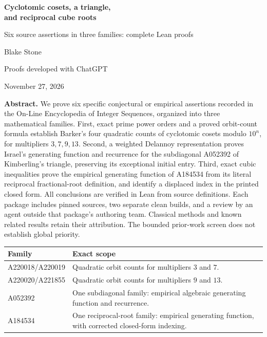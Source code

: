 \documentclass[11pt]{article}
\begin{document}
\begin{center}
{\LARGE\bfseries Cyclotomic cosets, a triangle,\\[3pt]
and reciprocal cube roots}\par
\vspace{0.5em}
{\large Six source assertions in three families: complete Lean proofs}\par
\vspace{0.5em}
{\large Blake Stone}\par
Proofs developed with ChatGPT\par
November 27, 2026
\end{center}

\textbf{Abstract.}
We prove six specific conjectural or empirical assertions recorded in the
On-Line Encyclopedia of Integer Sequences, organized into three mathematical
families. First, exact prime power orders and a proved orbit-count formula
establish Barker's four quadratic counts of cyclotomic cosets modulo $10^n$,
for multipliers $3,7,9,13$. Second, a weighted Delannoy representation proves
Israel's generating function and recurrence for the subdiagonal A052392 of
Kimberling's triangle, preserving its exceptional initial entry. Third, exact
cubic inequalities prove the empirical generating function of A184534 from
its literal reciprocal fractional-root definition, and identify a displaced
index in the printed closed form. All conclusions are verified in Lean from
source definitions. Each package includes pinned sources, two separate clean
builds, and a review by an agent outside that package's authoring team.
Classical methods and known related results retain their attribution.
The bounded prior-work screen does not establish global priority.

\begin{center}
\begin{tabular}{@{}l>{\raggedright\arraybackslash}p{4.2in}@{}}
\toprule
Family & Exact scope\\
\midrule
A220018/A220019 & Quadratic orbit counts for multipliers $3$ and $7$.\\
A220020/A221855 & Quadratic orbit counts for multipliers $9$ and $13$.\\
A052392 & One subdiagonal family: empirical algebraic generating function and recurrence.\\
A184534 & One reciprocal-root family: empirical generating function, with corrected closed-form indexing.\\
\bottomrule
\end{tabular}
\end{center}
\end{document}
